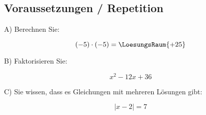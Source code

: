 

\subsection{Voraussetzungen / Repetition}
A) Berechnen Sie:

$$(-5)\cdot{}(-5) = \LoesungsRaum{+25}$$

B) Faktorisieren Sie:

$$x^2-12x+36$$



C) Sie wissen, dass es Gleichungen mit mehreren Lösungen gibt:

$$|x-2| = 7$$



\newpage

